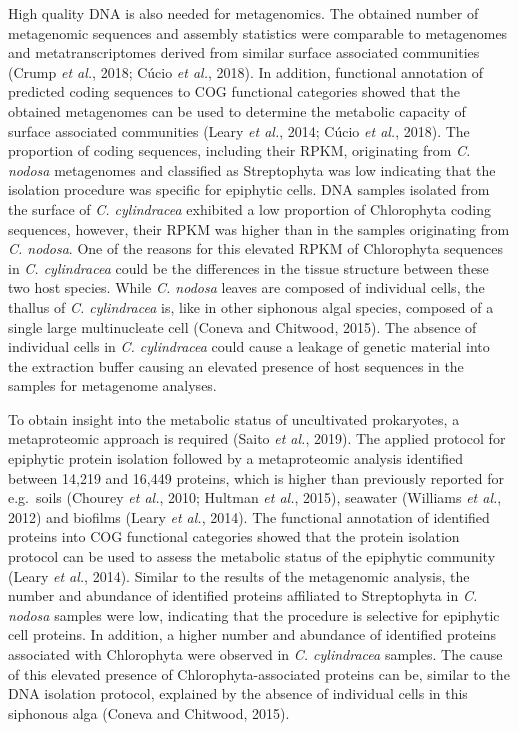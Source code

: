 \documentclass[12pt,]{article}
\begin{document}
High quality DNA is also needed for metagenomics. The obtained number of
metagenomic sequences and assembly statistics were comparable to
metagenomes and metatranscriptomes derived from similar surface
associated communities (Crump \emph{et al.}, 2018; Cúcio \emph{et al.},
2018). In addition, functional annotation of predicted coding sequences
to COG functional categories showed that the obtained metagenomes can be
used to determine the metabolic capacity of surface associated
communities (Leary \emph{et al.}, 2014; Cúcio \emph{et al.}, 2018). The
proportion of coding sequences, including their RPKM, originating from
\emph{C. nodosa} metagenomes and classified as Streptophyta was low
indicating that the isolation procedure was specific for epiphytic
cells. DNA samples isolated from the surface of \emph{C. cylindracea}
exhibited a low proportion of Chlorophyta coding sequences, however,
their RPKM was higher than in the samples originating from \emph{C.
nodosa}. One of the reasons for this elevated RPKM of Chlorophyta
sequences in \emph{C. cylindracea} could be the differences in the
tissue structure between these two host species. While \emph{C. nodosa}
leaves are composed of individual cells, the thallus of \emph{C.
cylindracea} is, like in other siphonous algal species, composed of a
single large multinucleate cell (Coneva and Chitwood, 2015). The absence
of individual cells in \emph{C. cylindracea} could cause a leakage of
genetic material into the extraction buffer causing an elevated presence
of host sequences in the samples for metagenome analyses.

To obtain insight into the metabolic status of uncultivated prokaryotes,
a metaproteomic approach is required (Saito \emph{et al.}, 2019). The
applied protocol for epiphytic protein isolation followed by a
metaproteomic analysis identified between 14,219 and 16,449 proteins,
which is higher than previously reported for e.g.~soils (Chourey
\emph{et al.}, 2010; Hultman \emph{et al.}, 2015), seawater (Williams
\emph{et al.}, 2012) and biofilms (Leary \emph{et al.}, 2014). The
functional annotation of identified proteins into COG functional
categories showed that the protein isolation protocol can be used to
assess the metabolic status of the epiphytic community (Leary \emph{et
al.}, 2014). Similar to the results of the metagenomic analysis, the
number and abundance of identified proteins affiliated to Streptophyta
in \emph{C. nodosa} samples were low, indicating that the procedure is
selective for epiphytic cell proteins. In addition, a higher number and
abundance of identified proteins associated with Chlorophyta were
observed in \emph{C. cylindracea} samples. The cause of this elevated
presence of Chlorophyta-associated proteins can be, similar to the DNA
isolation protocol, explained by the absence of individual cells in this
siphonous alga (Coneva and Chitwood, 2015).
\end{document}
